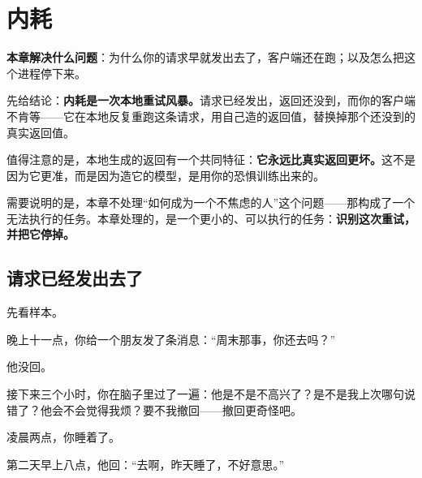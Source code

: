 \chapter{内耗}


\begin{guideblock}
\textbf{本章解决什么问题}：为什么你的请求早就发出去了，客户端还在跑；以及怎么把这个进程停下来。

先给结论：\textbf{内耗是一次本地重试风暴。}请求已经发出，返回还没到，而你的客户端不肯等——它在本地反复重跑这条请求，用自己造的返回值，替换掉那个还没到的真实返回值。

值得注意的是，本地生成的返回有一个共同特征：\textbf{它永远比真实返回更坏。}这不是因为它更准，而是因为造它的模型，是用你的恐惧训练出来的。

需要说明的是，本章不处理“如何成为一个不焦虑的人”这个问题——那构成了一个无法执行的任务。本章处理的，是一个更小的、可以执行的任务：\textbf{识别这次重试，并把它停掉。}
\end{guideblock}

\hcirule

\section{请求已经发出去了}

先看样本。

\par
\begin{mdquote}
晚上十一点，你给一个朋友发了条消息：“周末那事，你还去吗？”\par
\vspace{0.3\baselineskip}
他没回。\par
\vspace{0.3\baselineskip}
接下来三个小时，你在脑子里过了一遍：他是不是不高兴了？是不是我上次哪句说错了？他会不会觉得我烦？要不我撤回——撤回更奇怪吧。\par
\vspace{0.3\baselineskip}
凌晨两点，你睡着了。\par
\vspace{0.3\baselineskip}
第二天早上八点，他回：“去啊，昨天睡了，不好意思。”
\end{mdquote}

